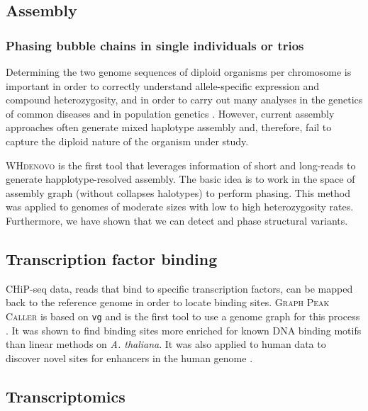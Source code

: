 \subsection{Assembly}

\subsubsection{Phasing bubble chains in single individuals or trios}

Determining the two genome sequences of diploid organisms per chromosome is important in order to correctly understand allele-specific expression and compound heterozygosity, and in order to carry out many analyses in the genetics of common diseases and in population genetics \cite{tewhey2011importance}. 
However, current assembly approaches often generate mixed haplotype assembly and, therefore, fail to capture the diploid nature of the organism under study. 

\textsc{WHdenovo} \cite{garg2019trio, garg2018graph} is the first tool that leverages information of short and long-reads to generate happlotype-resolved assembly. 
The basic idea is to work in the space of assembly graph (without collapses halotypes) to perform phasing. 
This method was applied to genomes of moderate sizes with low to high heterozygosity rates. 
Furthermore, we have shown that we can detect and phase structural variants.

\subsection{Transcription factor binding}

CHiP-seq data, reads that bind to specific transcription factors, can be mapped back to the reference genome in order to locate binding sites.
\textsc{Graph Peak Caller} is based on \texttt{vg} and is the first tool to use a genome graph for this process \cite{Grytten_2019}.
It was shown to find binding sites more enriched for known DNA binding motifs than linear methods on \emph{A. thaliana}.
It was also applied to human data to discover novel sites for enhancers in the human genome \cite{groza2019personalized}. 


\subsection{Transcriptomics}
\label{sec:transcriptomics}

